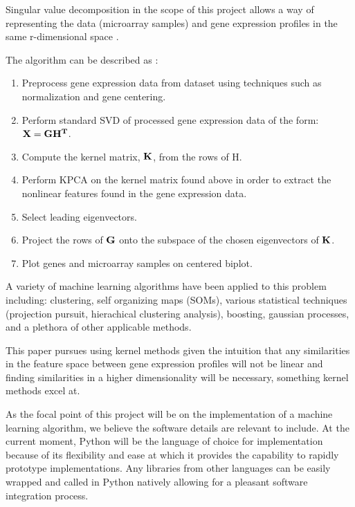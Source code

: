 \documentclass[10pt,a4,oneside]{report}
\begin{document}
Singular value decomposition in the scope of this project allows a way of representing the data (microarray samples) and gene expression profiles in the same r-dimensional space \cite{Reverter2010200}.


The algorithm can be described as \cite{Reverter2010200}: %

\begin{enumerate}  \itemsep -2pt %
\item
Preprocess gene expression data from dataset using techniques such as normalization and gene centering.
\item 
Perform standard SVD of processed gene expression data of the form: $\bf{X} = \bf{G}\bf{H}^{T}$.
\item
Compute the kernel matrix, $\bf{K}$, from  the rows of H.
\item
Perform KPCA on the kernel matrix found above in order to extract the nonlinear features found in the gene expression data.
\item
Select leading eigenvectors.
\item
Project the rows of $\bf{G}$ onto the subspace of the chosen eigenvectors of $\bf{K}$.
\item
Plot genes and microarray samples on centered biplot.
\end{enumerate}

A variety of machine learning algorithms have been applied to this problem including:
clustering, self organizing maps (SOMs), various statistical techniques (projection pursuit, hierachical clustering analysis),
boosting, gaussian processes, and a plethora of other applicable methods.

This paper pursues using kernel methods  given the intuition that any similarities in the feature space between gene expression
profiles will not be linear and finding similarities in a higher dimensionality will be necessary, something kernel methods excel at.

As the focal point of this project will be on the implementation of a machine learning algorithm, we believe the software details are relevant to include.
At the current moment, Python will be the language of choice for implementation because of its flexibility and ease at which it provides the capability
to rapidly prototype implementations. Any libraries from other languages can be easily wrapped and called in Python natively allowing for a pleasant
software integration process.
\end{document}
